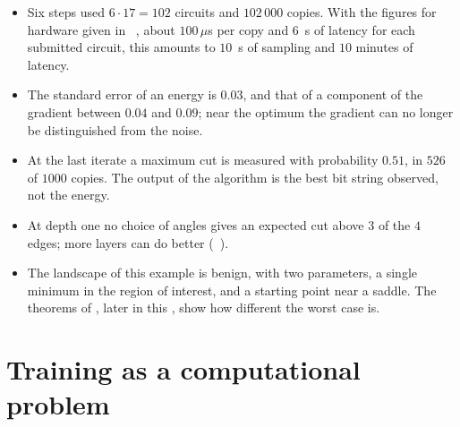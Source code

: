 \documentclass[handoutsbeamer.tex]{subfiles}
\begin{document}
\begin{frame}\label{fr:ch05:workedlast}
\onp{\footnotesize}
\begin{itemize}\setlength\itemsep{0.25em}
    \item Six steps used $6\cdot17 = 102$ circuits and $102\,000$ copies. With the figures for hardware given in \Chap~, about $100\,\mu$s per copy and $6$~s of latency for each submitted circuit, this amounts to $10$~s of sampling and $10$ minutes of latency.
    \item The standard error of an energy is $0.03$, and that of a component of the gradient between $0.04$ and $0.09$; near the optimum the gradient can no longer be distinguished from the noise.
    \item At the last iterate a maximum cut is measured with probability $0.51$, in $526$ of $1000$ copies. The output of the algorithm is the best bit string observed, not the energy.
    \item At depth one no choice of angles gives an expected cut above $3$ of the $4$ edges; more layers can do better (\Chap~).
    \item The landscape of this example is benign, with two parameters, a single minimum in the region of interest, and a starting point near a saddle. The theorems of \citet{bittel2021training}, later in this \chap{}, show how different the worst case is.
\end{itemize}
\end{frame}

\section{Training as a computational problem}\label{sec:ch05:formal}
\end{document}
